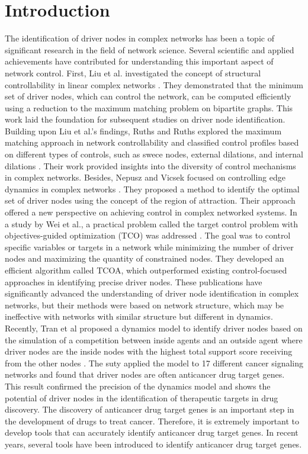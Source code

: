 \documentclass[5p,,preprint,12pt]{elsarticle}
\begin{document}

\section{Introduction}
The identification of driver nodes in complex networks has been a topic of significant research in the field of network science. Several scientific and applied achievements have contributed for understanding this important aspect of network control. First, Liu et al. investigated the concept of structural controllability in linear complex networks \cite{1}. They demonstrated that the minimum set of driver nodes, which can control the network, can be computed efficiently using a reduction to the maximum matching problem on bipartite graphs. This work laid the foundation for subsequent studies on driver node identification. Building upon Liu et al.'s findings, Ruths and Ruths explored the maximum matching approach in network controllability and classified control profiles based on different types of controls, such as swece nodes, external dilations, and internal dilations \cite{2}. Their work provided insights into the diversity of control mechanisms in complex networks. Besides, Nepusz and Vicsek focused on controlling edge dynamics in complex networks \cite{3}. They proposed a method to identify the optimal set of driver nodes using the concept of the region of attraction. Their approach offered a new perspective on achieving control in complex networked systems. In a study by Wei et al., a practical problem called the target control problem with objectives-guided optimization (TCO) was addressed \cite{4}. The goal was to control specific variables or targets in a network while minimizing the number of driver nodes and maximizing the quantity of constrained nodes. They developed an efficient algorithm called TCOA, which outperformed existing control-focused approaches in identifying precise driver nodes. These publications have significantly advanced the understanding of driver node identification in complex networks, but their methods were based on network structure, which may be ineffective with networks with similar structure but different in dynamics. Recently, Tran et al proposed a dynamics model to identify driver nodes based on the simulation of a competition between inside agents and an outside agent where driver nodes are the inside nodes with the highest total support score receiving from the other nodes \cite{5}. The suty  applied the model to 17 different cancer signaling networks and found that driver nodes are often anticancer drug target genes. This result confirmed the precision of the dynamics model and shows the potential of driver nodes in the identification of therapeutic targets in drug discovery. The discovery of anticancer drug target genes is an important step in the development of drugs to treat cancer. Therefore, it is extremely important to develop tools that can accurately identify anticancer drug target genes. In recent years, several tools have been introduced to identify anticancer drug target genes. 
\end{document}
